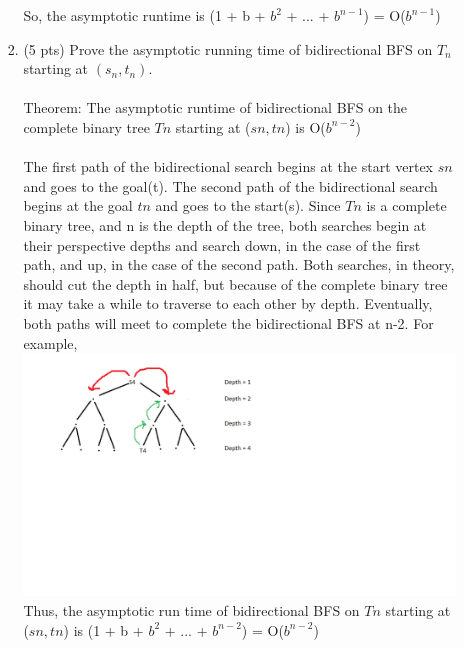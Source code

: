 \documentclass[12pt]{article}
\begin{document}
\begin{enumerate}
\begin{enumerate}
\begin{enumerate}
	 So, the asymptotic runtime is (1 + b + $b^{2}$ + ... + $b^{n-1}$) = O($b^{n-1}$) 
	
	
	
	 
	 
	\pagebreak

	\item (5 pts) Prove the asymptotic running time of bidirectional BFS on $T_n$ starting at $(s_n, t_n)$.
	\\
	\\Theorem: The asymptotic runtime of bidirectional BFS on the complete binary tree $T{n}$ starting at ($s{n}, t{n}$) is O($b^{n-2}$)\\
\\The first path of the bidirectional search begins at the start vertex $s{n}$ and goes to the goal(t). The second path of the bidirectional search begins at the goal $t{n}$ and goes to the start(s). Since $T{n}$ is a complete binary tree, and n is the depth of the tree, both searches begin at their perspective depths and search down, in the case of the first path, and up, in the case of the second path. Both searches, in theory, should cut the depth in half, but because of the complete binary tree it may take a while to traverse to each other by depth. Eventually, both paths will meet to complete the bidirectional BFS at n-2. 
For example, \\
\includegraphics[scale = 0.5]{bfstime2.png}
Thus, the asymptotic run time of bidirectional BFS on $T{n}$ starting at ($s{n}, t{n}$) is (1 + b + $b^{2}$ + ... + $b^{n-2}$) = O($b^{n-2}$)
	\pagebreak
	
	\end{enumerate}		
	\end{enumerate}
	


\end{enumerate}
\end{document}
